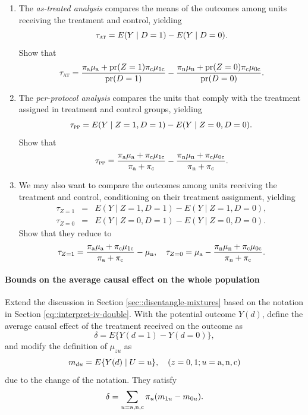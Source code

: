 \begin{enumerate}
\item 
The {\it as-treated analysis} compares the means of the outcomes among units receiving the treatment and control, yielding
$$
\tau_\textsc{at} = E(Y\mid D=1) - E(Y\mid D=0).
$$
Show that 
$$
\tau_\textsc{at} = \frac{  \pi_{\textup{a}} \mu_{\textup{a}} + \textup{pr}(Z=1)\pi_{\textup{c}} \mu_{1\textup{c}}   }{   \textup{pr}(D=1) } 
- \frac{  \pi_{\textup{n}} \mu_{\textup{n}} + \textup{pr}(Z=0) \pi_{\textup{c}} \mu_{0\textup{c}}   }{   \textup{pr}(D=0) } .
$$


\item 
The {\it per-protocol analysis} compares the units that comply with the treatment assigned in treatment and control groups, yielding
$$
\tau_\textsc{pp} = E(Y\mid Z=1, D=1) - E(Y\mid Z=0, D=0).
$$
Show that 
$$
\tau_\textsc{pp} =\frac{  \pi_{\textup{a}} \mu_{\textup{a}} + \pi_{\textup{c}} \mu_{1\textup{c}} }{  \pi_{\textup{a}}   + \pi_{\textup{c}} }
- \frac{  \pi_{\textup{n}} \mu_{\textup{n}} + \pi_{\textup{c}} \mu_{0\textup{c}} }{  \pi_{\textup{n}}   + \pi_{\textup{c}} }.
$$


\item 
We may also want to compare the outcomes among units receiving the treatment and control, conditioning on their treatment assignment, yielding
\begin{eqnarray*}
\tau_{Z=1} &=& E(Y\mid Z=1, D=1) - E(Y\mid Z=1, D=0),\\ 
\tau_{Z=0} &=& E(Y\mid Z=0, D=1) - E(Y\mid Z=0, D=0).
\end{eqnarray*}
Show that they reduce to
$$
\tau_{Z=1}  = \frac{  \pi_{\textup{a}} \mu_{\textup{a}} + \pi_{\textup{c}} \mu_{1\textup{c}} }{  \pi_{\textup{a}}   + \pi_{\textup{c}} } - \mu_{\textup{n}},\quad
\tau_{Z=0} = \mu_{\textup{a}} - \frac{  \pi_{\textup{n}} \mu_{\textup{n}} + \pi_{\textup{c}} \mu_{0\textup{c}} }{  \pi_{\textup{n}}   + \pi_{\textup{c}} }.
$$
\end{enumerate}
 
 
\paragraph{Bounds on the average causal effect on the whole population}\label{para::bounds-ACE}


Extend the discussion in Section \ref{sec::disentangle-mixtures} based on the notation in Section \ref{eq::interpret-iv-double}. With the potential outcome $Y(d)$, define the average causal effect of the treatment received on the outcome as
$$
\delta = E\{  Y(d=1) - Y(d=0) \},
$$
and modify the definition of $\mu_{zu} $ as 
$$
m_{du} = E\{  Y(d) \mid U = u\},\quad  (z=0,1;u=\textup{a}, \textup{n}, \textup{c}) 
$$  
due to the change of the notation. 
They satisfy
$$
\delta = \sum_{u = \textup{a}, \textup{n}, \textup{c}}  \pi_u  (m_{1u} - m_{0u}).
$$

